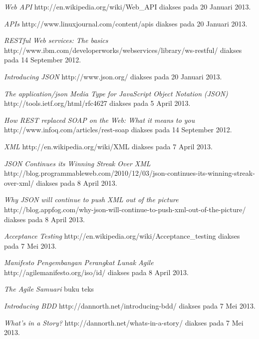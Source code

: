 \documentclass[a4paper, 12pt, oneside]{report}
\begin{document}
\begin{thebibliography}{99}
  \emph{Web API}
  http://en.wikipedia.org/wiki/Web\_API
  diakses pada 20 Januari 2013.
  
  \emph{APIs}
  http://www.linuxjournal.com/content/apis
  diakses pada 20 Januari 2013.

  \emph{RESTful Web services: The basics}
  \\http://www.ibm.com/developerworks/webservices/library/ws-restful/
  diakses pada 14 September 2012.

  \emph{Introducing JSON} http://www.json.org/
  diakses pada 20 Januari 2013.
  
  \emph{The application/json Media Type for JavaScript Object Notation (JSON)} http://tools.ietf.org/html/rfc4627
  diakses pada 5 April 2013.
    
  \emph{How REST replaced SOAP on the Web: What it means to you}
  http://www.infoq.com/articles/rest-soap
  diakses pada 14 September 2012.
  
  \emph{XML}
  http://en.wikipedia.org/wiki/XML
  diakses pada 7 April 2013.
  
  \emph{JSON Continues its Winning Streak Over XML}
  http://blog.programmableweb.com/2010/12/03/json-continues-its-winning-streak-over-xml/
  diakses pada 8 April 2013.
  
  \emph{Why JSON will continue to push XML out of the picture}
  http://blog.appfog.com/why-json-will-continue-to-push-xml-out-of-the-picture/
  diakses pada 8 April 2013.
  
  \emph{Acceptance Testing}
  http://en.wikipedia.org/wiki/Acceptance\_testing
  diakses pada 7 Mei 2013.

  \emph{Manifesto Pengembangan Perangkat Lunak Agile}
  http://agilemanifesto.org/iso/id/
  diakses pada 8 April 2013.
  
  \emph{The Agile Samuari}
  buku teks
  
  \emph{Introducing BDD}
  http://dannorth.net/introducing-bdd/
  diakses pada 7 Mei 2013.
  
  \emph{What's in a Story?}
  http://dannorth.net/whats-in-a-story/
  diakses pada 7 Mei 2013.
 
\end{thebibliography}
\end{document}
